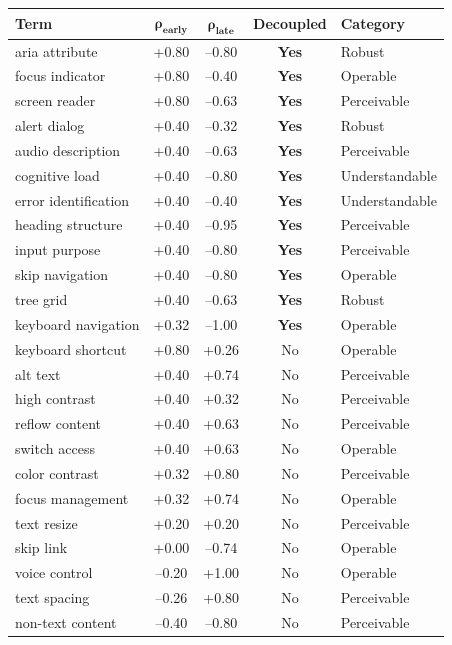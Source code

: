 \documentclass[10pt]{article} %
\begin{document}
\begin{table}[H]
\centering
\scriptsize
\begin{tabular}{|l|c|c|c|l|}
\hline
\textbf{Term} & $\mathbf{\rho_\text{early}}$ & $\mathbf{\rho_\text{late}}$ & \textbf{Decoupled} & \textbf{Category} \\
\hline
aria attribute & +0.80 & --0.80 & \textbf{Yes} & Robust \\
focus indicator & +0.80 & --0.40 & \textbf{Yes} & Operable \\
screen reader & +0.80 & --0.63 & \textbf{Yes} & Perceivable \\
alert dialog & +0.40 & --0.32 & \textbf{Yes} & Robust \\
audio description & +0.40 & --0.63 & \textbf{Yes} & Perceivable \\
cognitive load & +0.40 & --0.80 & \textbf{Yes} & Understandable \\
error identification & +0.40 & --0.40 & \textbf{Yes} & Understandable \\
heading structure & +0.40 & --0.95 & \textbf{Yes} & Perceivable \\
input purpose & +0.40 & --0.80 & \textbf{Yes} & Perceivable \\
skip navigation & +0.40 & --0.80 & \textbf{Yes} & Operable \\
tree grid & +0.40 & --0.63 & \textbf{Yes} & Robust \\
keyboard navigation & +0.32 & --1.00 & \textbf{Yes} & Operable \\
keyboard shortcut & +0.80 & +0.26 & No & Operable \\
alt text & +0.40 & +0.74 & No & Perceivable \\
high contrast & +0.40 & +0.32 & No & Perceivable \\
reflow content & +0.40 & +0.63 & No & Perceivable \\
switch access & +0.40 & +0.63 & No & Operable \\
color contrast & +0.32 & +0.80 & No & Perceivable \\
focus management & +0.32 & +0.74 & No & Operable \\
text resize & +0.20 & +0.20 & No & Perceivable \\
skip link & +0.00 & --0.74 & No & Operable \\
voice control & --0.20 & +1.00 & No & Operable \\
text spacing & --0.26 & +0.80 & No & Perceivable \\
non-text content & --0.40 & --0.80 & No & Perceivable \\

\end{tabular}
\end{table}
\end{document}
